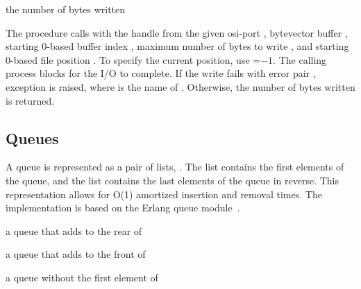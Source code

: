 \begin{procedure}
\end{procedure}
\returns{} the number of bytes written

The  procedure calls  with
the handle from the given osi-port , bytevector buffer
, starting 0-based buffer index , maximum number of
bytes to write , and starting 0-based file position
. To specify the current position, use =$-1$. The
calling process blocks for the I/O to complete. If the write fails
with error pair , exception
 is raised, where
 is the name of . Otherwise, the number of bytes
written is returned.

\subsection {Queues}

A queue is represented as a pair of lists,
. The  list contains the first
elements of the queue, and the  list contains the last
elements of the queue in reverse. This representation allows for O(1)
amortized insertion and removal times. The implementation is based on
the Erlang queue module~\cite{queue-ref}.

\begin{procedure}
\end{procedure}
\returns{} a queue that adds  to the rear of 

\begin{procedure}
\end{procedure}
\returns{} a queue that adds  to the front of 

\begin{procedure}
\end{procedure}
\returns{} a queue without the first element of 

